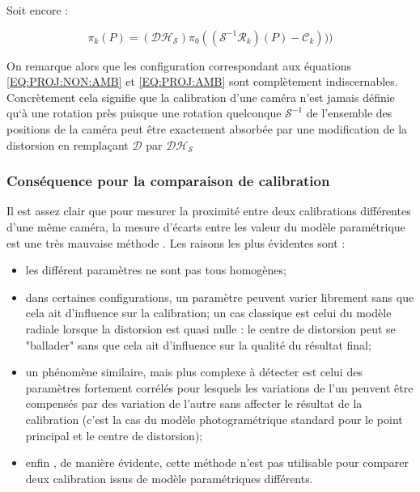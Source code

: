 Soit encore :

\begin{equation}
  \pi_k(P)    =  (\mathcal{D}\mathcal{H_S} ) \pi_0 ((\mathcal{S}^{-1}\mathcal{R}_k)(P)-\mathcal{C}_k)))
  \label{EQ:PROJ:AMB}
\end{equation}

On remarque alors que les configuration correspondant aux  \'equations 
\ref{EQ:PROJ:NON:AMB} et \ref{EQ:PROJ:AMB} sont compl\`etement indiscernables. 
Concr\`etement cela signifie que la calibration d'une cam\'era n'est
jamais d\'efinie qu`\`a une rotation pr\`es puisque une rotation 
quelconque $\mathcal{S}^{-1}$ de l'ensemble des positions de la cam\'era peut
\^etre exactement absorb\'ee par une modification de la distorsion en
rempla\c{c}ant $\mathcal{D}$ par $\mathcal{D H_S}$


\subsubsection{Cons\'equence pour la comparaison de calibration}

Il est assez clair  que pour mesurer  la proximit\'e entre deux
calibrations diff\'erentes d'une m\^eme cam\'era, la mesure
d'\'ecarts entre les valeur du mod\`ele param\'etrique est une tr\`es
mauvaise m\'ethode . Les
raisons les plus \'evidentes sont :

\begin{itemize}
   \item  les diff\'erent  param\`etres ne sont pas tous homog\`enes;

   \item  dans certaines configurations, un param\`etre peuvent varier 
          librement sans que cela ait d'influence sur la calibration;
          un cas classique est celui du mod\`ele radiale lorsque la distorsion
          est quasi nulle : le centre de distorsion peut se "ballader" sans que
          cela ait d'influence sur la qualit\'e du r\'esultat final;

   \item  un ph\'enom\`ene similaire, mais plus complexe \`a
          d\'etecter est celui des param\`etres fortement corr\'el\'es pour
          lesquels les variations de l'un peuvent \^etre compens\'es par des variation 
          de l'autre sans affecter le r\'esultat de la calibration (c'est la cas du
          mod\`ele photogram\'etrique standard pour le point
          principal et le centre de distorsion);
          
   \item  enfin , de mani\`ere \'evidente, cette m\'ethode n'est pas utilisable
          pour comparer deux calibration issus de mod\`ele param\'etriques
          diff\'erents.
\end{itemize}

